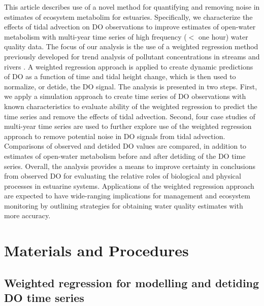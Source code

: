 \documentclass[letterpaper,12pt,oneside]{article}\usepackage[]{graphicx}\usepackage[]{color}
\begin{document}
This article describes use of a novel method for quantifying and removing noise in estimates of ecosystem metabolim for estuaries.  Specifically, we characterize the effects of tidal advection on \ac{DO} observations to improve estimates of open-water metabolism with multi-year time series of high frequency ($<$ one hour) water quality data.  The focus of our analysis is the use of a weighted regression method previously developed for trend analysis of pollutant concentrations in streams and rivers \citep{Hirsch10}.  A weighted regression approach is applied to create dynamic predictions of \ac{DO} as a function of time and tidal height change, which is then used to normalize, or detide, the \ac{DO} signal.  The analysis is presented in two steps.  First, we apply a simulation approach to create time series of \ac{DO} observations with known characteristics to evaluate ability of the weighted regression to predict the time series and remove the effects of tidal advection.  Second, four case studies of multi-year time series are used to further explore use of the weighted regression approach to remove potential noise in \ac{DO} signals from tidal advection.  Comparisons of observed and detided \ac{DO} values are compared, in addition to estimates of open-water metabolism before and after detiding of the \ac{DO} time series.  Overall, the analysis provides a means to improve certainty in conclusions from observed \ac{DO} for evaluating the relative roles of biological and physical processes in estuarine systems.  Applications of the weighted regression approach are expected to have wide-ranging implications for management and ecosystem monitoring by outlining strategies for obtaining water quality estimates with more accuracy.

\section{Materials and Procedures}

\subsection{Weighted regression for modelling and detiding \ac{DO} time series}
\end{document}
